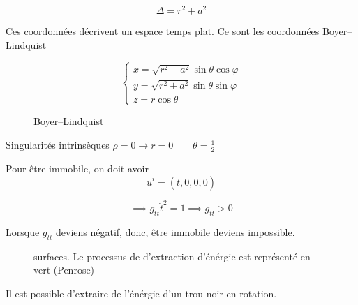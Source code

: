 \[ \Delta = r^{2}+ a^2 \] 

Ces coordonnées décrivent un espace temps plat. Ce sont les coordonnées Boyer–Lindquist

\[ \begin{cases}
	x = \sqrt{r^{2}+a^{2}} \sin\theta \cos\varphi\\
	y= \sqrt{r^{2}+ a^{2}}\sin\theta \sin\varphi\\
	z = r\cos\theta
\end{cases} \] 

\begin{figure}[ht]
    \centering
    \caption{Boyer–Lindquist}
    \label{fig:boyer–lindquist}
\end{figure}


Singularités intrinsèques 
$\rho =0 \to r=0 \qquad \theta = \frac{1}{2} $ 


Pour être immobile, on doit avoir \[ u^{i} = \left( \dot t ,0,0,0 \right)  \] 

\[ \implies g_{tt} \dot t^{2}  = 1 \implies g_{tt} > 0 \] 

Lorsque $g_{tt} $ deviens négatif, donc, être immobile deviens impossible.


\begin{figure}[ht]
    \centering
    \caption{surfaces. Le processus de d'extraction d'énérgie est représenté en vert (Penrose)}
    \label{fig:surfaces}
\end{figure}

Il est possible d'extraire de l'énérgie d'un trou noir en rotation. 




